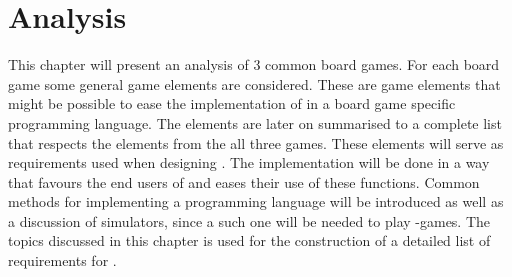 \chapter{Analysis}
This chapter will present an analysis of 3 common board games. For each board game some general game elements are considered. These are game elements that might be possible to ease the implementation of in a board game specific programming language. The elements are later on summarised to a complete list that respects the elements from the all three games. These elements will serve as requirements used when designing \productname{}. The implementation will be done in a way that favours the end users of \productname{} and eases their use of these functions. Common methods for implementing a programming language will be introduced as well as a discussion of simulators, since a such one will be needed to play \productname{}-games. The topics discussed in this chapter is used for the construction of a detailed list of requirements for \productname{}.






%


%




